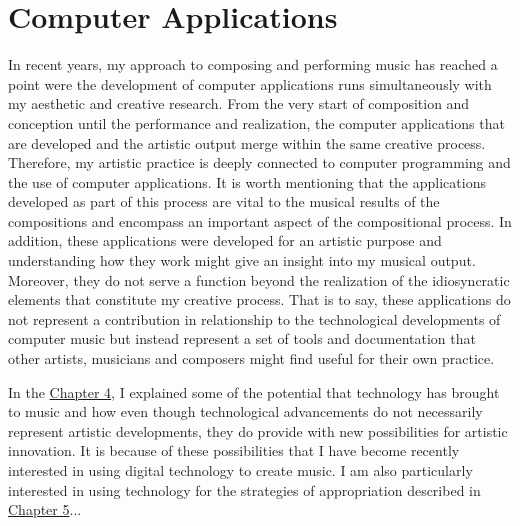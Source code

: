\hypertarget{chapter6}{}
\chapter{Computer Applications}

In recent years, my approach to composing and performing music has reached a point were the development of computer applications runs simultaneously with my aesthetic and creative research. From the very start of composition and conception until the performance and realization, the computer applications that are developed and the artistic output merge within the same creative process. Therefore, my artistic practice is deeply connected to computer programming and the use of computer applications. It is worth mentioning that the applications developed as part of this process are vital to the musical results of the compositions and encompass an important aspect of the compositional process. In addition, these applications were developed for an artistic purpose and understanding how they work might give an insight into my musical output. Moreover, they do not serve a function beyond the realization of the idiosyncratic elements that constitute my creative process. That is to say, these applications do not represent a contribution in relationship to the technological developments of computer music but instead represent a set of tools and documentation that other artists, musicians and composers might find useful for their own practice.

In the \hyperlink{chapter4}{Chapter 4}, I explained some of the potential that technology has brought to music and how even though technological advancements do not necessarily represent artistic developments, they do provide with new possibilities for artistic innovation. It is because of these possibilities that I have become recently interested in using digital technology to create music. I am also particularly interested in using technology for the strategies of appropriation described in \hyperlink{chapter5}{Chapter 5}... 
 
